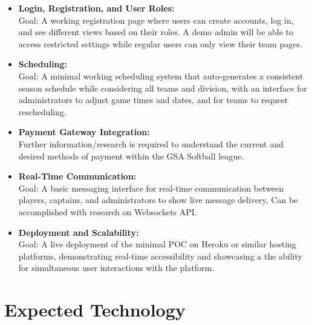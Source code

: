 \documentclass{article}
\begin{document}
\begin{itemize}
	\item \textbf{Login, Registration, and User Roles:} \\ Goal: A working registration page where users can create accounts, log in, and see different views based on their roles. A demo admin will be able to access restricted settings while regular users can only view their team pages. 
	\item \textbf{Scheduling:} \\ Goal: A minimal working scheduling system that auto-generates a consistent season schedule while considering all teams and division, with an interface for administrators to adjust game times and dates, and for teams to request rescheduling. 
  \item \textbf{Payment Gateway Integration:} \\ Further information/research is required to understand the current and desired methods of payment within the GSA Softball league. 
  \item \textbf{Real-Time Communication:} \\ Goal: A basic messaging interface for real-time communication between players, captains, and administrators to show live message delivery, Can be accomplished with research on Websockets API.
  \item \textbf{Deployment and Scalability:} \\ Goal: A live deployment of the minimal POC on Heroku or similar hosting platforms, demonstrating real-time accessibility and showcasing a the ability for simultaneous user interactions with the platform.
\end{itemize}

\section{Expected Technology}


\end{document}
